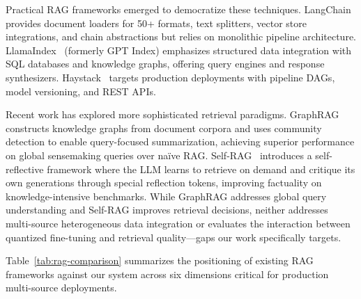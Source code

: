 \documentclass[pdflatex,sn-basic]{sn-jnl}
\begin{document}
Practical RAG frameworks emerged to democratize these techniques. LangChain~\citep{langchain2023} provides document loaders for 50+ formats, text splitters, vector store integrations, and chain abstractions but relies on monolithic pipeline architecture. LlamaIndex~\citep{llamaindex2023} (formerly GPT Index) emphasizes structured data integration with SQL databases and knowledge graphs, offering query engines and response synthesizers. Haystack~\citep{haystack2023} targets production deployments with pipeline DAGs, model versioning, and REST APIs.

Recent work has explored more sophisticated retrieval paradigms. GraphRAG~\citep{edge2024graphrag} constructs knowledge graphs from document corpora and uses community detection to enable query-focused summarization, achieving superior performance on global sensemaking queries over na\"ive RAG. Self-RAG~\citep{asai2024selfrag} introduces a self-reflective framework where the LLM learns to retrieve on demand and critique its own generations through special reflection tokens, improving factuality on knowledge-intensive benchmarks. While GraphRAG addresses global query understanding and Self-RAG improves retrieval decisions, neither addresses multi-source heterogeneous data integration or evaluates the interaction between quantized fine-tuning and retrieval quality—gaps our work specifically targets.

Table~\ref{tab:rag-comparison} summarizes the positioning of existing RAG frameworks against our system across six dimensions critical for production multi-source deployments.
\end{document}
